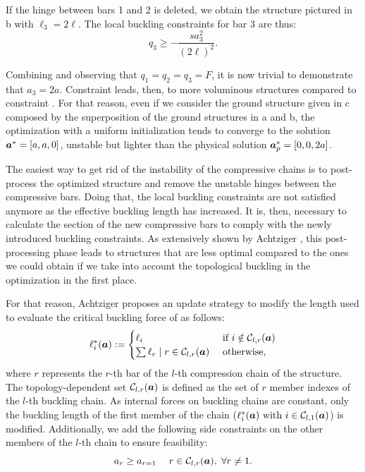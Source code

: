 If the hinge between bars 1 and 2 is deleted, we obtain the structure pictured in b with $\ell_3=2\ell$. The local buckling constraints for bar 3 are thus:
\begin{equation}
    q_3\geq -\frac{s a_3^2}{(2\ell)^2}.
    \label{eq:04_chain_2}
\end{equation}

Combining   and observing that $q_1=q_2=q_3=F$, it is now trivial to demonstrate that $a_3=2a$. Constraint  leads, then, to more voluminous structures compared to constraint . For that reason, even if we consider the ground structure given in c composed by the superposition of the ground structures in a and b, the optimization with a uniform initialization tends to converge to the solution $\bm{a}^*=[a,a,0]$, unstable but lighter than the physical solution $\bm{a}_p^*=[0,0,2a]$. 

The easiest way to get rid of the instability of the compressive chains is to post-process the optimized structure and remove the unstable hinges between the compressive bars. Doing that, the local buckling constraints are not satisfied anymore as the effective buckling length has increased. It is, then, necessary to calculate the section of the new compressive bars to comply with the newly introduced buckling constraints. As extensively shown by Achtziger , this post-processing phase leads to structures that are less optimal compared to the ones we could obtain if we take into account the topological buckling in the optimization in the first place.

For that reason, Achtziger proposes an update strategy to modify the length used to evaluate the critical buckling force of  as follows:
\begin{equation}
    \ell^*_i(\bm{a}):= 
    \begin{cases}
        \ell_i & \text { if } i \notin \mathcal{C}_{l,r}(\bm{a}) \\
        \sum \ell_{r} \;|\; r \in \mathcal{C}_{l,r}(\bm{a})  & \text { otherwise,}
    \end{cases}
    \label{eq:04_chain_len}
\end{equation}
where $r$ represents the $r$-th bar of the $l$-th compression chain of the structure. The topology-dependent set $\mathcal{C}_{l,r}(\bm{a})$ is defined as the set of $r$ member indexes of the $l$-th buckling chain. As internal forces on buckling chains are constant, only the buckling length of the first member of the chain ($\ell^*_i(\bm{a}) \text{ with } i \in \mathcal{C}_{l,1}(\bm{a})$) is modified. Additionally, we add the following side constraints on the other members of the $l$-th chain to ensure feasibility:
\begin{equation}
    a_{r}\geq a_{r=1} \quad \; r \in \mathcal{C}_{l,r}(\bm{a}), \; \forall r \neq 1.
    \label{eq:04_side_cons_chain}
\end{equation}

